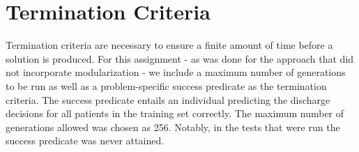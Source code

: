 \section{Termination Criteria}
Termination criteria are necessary to ensure a finite amount of time before a solution is produced. For this assignment - as was done for the approach that did not incorporate modularization - we include a maximum number of generations to be run as well as a problem-specific success predicate as the termination criteria. The success predicate entails an individual predicting the discharge decisions for all patients in the training set correctly. The maximum number of generations allowed was chosen as 256. Notably, in the tests that were run the success predicate was never attained.
